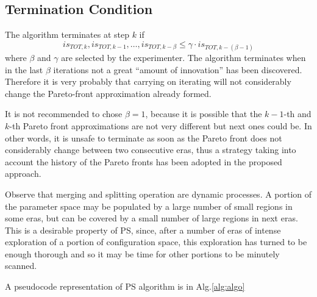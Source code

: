\subsection{Termination Condition}
The algorithm terminates at step $k$ if
\[
is_{TOT,k},is_{TOT,k-1},\dots,is_{TOT,k-\beta}\le\gamma\cdot is_{TOT,k-\left(\beta-1\right)}
\]
 where $\beta$ and $\gamma$ are selected by the experimenter. 
The algorithm terminates when in the last
$\beta$ iterations not a great ``amount of innovation'' has been
discovered. Therefore it is very probably that carrying on iterating
will not considerably change the Pareto-front approximation already formed. 

It is not recommended to chose $\beta=1$, because it is possible that the
$k-1$-th and $k$-th Pareto front approximations are not very different but next ones could be. In other words,
it is unsafe to terminate as soon as the Pareto front does not considerably change
between two consecutive eras, thus a strategy taking into
account the history of the Pareto fronts has been adopted in the
proposed approach.


Observe that merging and splitting operation are dynamic processes. A portion
of the parameter space may be populated by a large number of small
regions in some eras, but can be covered by a small number of large
regions in next eras. This is a desirable property of PS, since, after a number
of eras of intense exploration of a portion of configuration space, this
exploration has turned to be enough thorough and so it may be time for
other portions to be minutely scanned.

A pseudocode representation of PS algorithm is in Alg.\ref{alg:algo}

